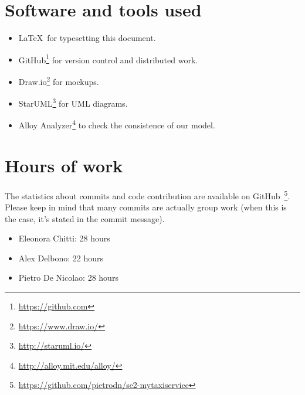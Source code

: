 \section{Software and tools used}
\begin{itemize}
    \item \LaTeX\, for typesetting this document.
    \item GitHub\footnote{\url{https://github.com}} for version control and distributed work.
    \item Draw.io\footnote{\url{https://www.draw.io/}} for mockups.
    \item StarUML\footnote{\url{http://staruml.io/}} for UML diagrams.
    \item Alloy Analyzer\footnote{\url{http://alloy.mit.edu/alloy/}} to check the consistence of our model.
\end{itemize}

\section{Hours of work}
The statistics about commits and code contribution are available on GitHub~\footnote{\url{https://github.com/pietrodn/se2-mytaxiservice}}.
Please keep in mind that many commits are actually group work (when this is the case, it's stated in the commit message).

\begin{itemize}
    \item Eleonora Chitti: 28 hours
    \item Alex Delbono: 22 hours
    \item Pietro De Nicolao: 28 hours
\end{itemize}

